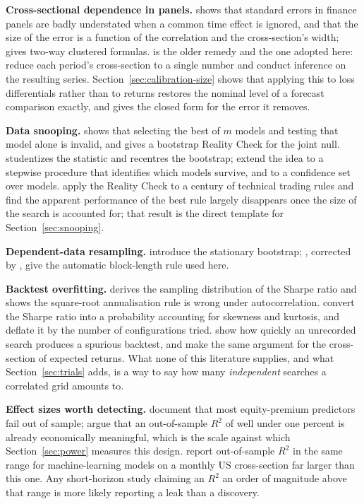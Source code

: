 \documentclass{article}
\theoremstyle{plain}
\theoremstyle{remark}
\begin{document}
\textbf{Cross-sectional dependence in panels.} \citet{petersen2009} shows that
standard errors in finance panels are badly understated when a common time
effect is ignored, and that the size of the error is a function of the
correlation and the cross-section's width; \citet{thompson2011} gives two-way
clustered formulas. \citet{fama1973} is the older remedy and the one adopted
here: reduce each period's cross-section to a single number and conduct
inference on the resulting series. Section~\ref{sec:calibration-size} shows that
applying this to loss differentials rather than to returns restores the nominal
level of a forecast comparison exactly, and gives the closed form for the error
it removes.

\textbf{Data snooping.} \citet{white2000} shows that selecting the best of $m$
models and testing that model alone is invalid, and gives a bootstrap Reality
Check for the joint null. \citet{hansen2005} studentizes the statistic and
recentres the bootstrap; \citet{romano2005} extend the idea to a stepwise
procedure that identifies which models survive, and \citet{hansen2011} to a
confidence set over models. \citet{sullivan1999} apply the Reality Check to a
century of technical trading rules and find the apparent performance of the best
rule largely disappears once the size of the search is accounted for; that
result is the direct template for Section~\ref{sec:snooping}.

\textbf{Dependent-data resampling.} \citet{politis1994} introduce the stationary
bootstrap; \citet{politis2004}, corrected by \citet{patton2009}, give the
automatic block-length rule used here.

\textbf{Backtest overfitting.} \citet{lo2002} derives the sampling distribution
of the Sharpe ratio and shows the square-root annualisation rule is wrong under
autocorrelation. \citet{bailey2012} convert the Sharpe ratio into a probability
accounting for skewness and kurtosis, and \citet{bailey2014dsr} deflate it by
the number of configurations tried. \citet{bailey2014pseudo} show how quickly an
unrecorded search produces a spurious backtest, and \citet{harvey2016} make the
same argument for the cross-section of expected returns. What none of this
literature supplies, and what Section~\ref{sec:trials} adds, is a way to say how
many \emph{independent} searches a correlated grid amounts to.

\textbf{Effect sizes worth detecting.} \citet{welch2008} document that most
equity-premium predictors fail out of sample; \citet{campbell2008} argue that an
out-of-sample $R^2$ of well under one percent is already economically
meaningful, which is the scale against which Section~\ref{sec:power} measures
this design. \citet{gu2020} report out-of-sample $R^2$ in the same range for
machine-learning models on a monthly US cross-section far larger than this one.
Any short-horizon study claiming an $R^2$ an order of magnitude above that range
is more likely reporting a leak than a discovery.
\end{document}
